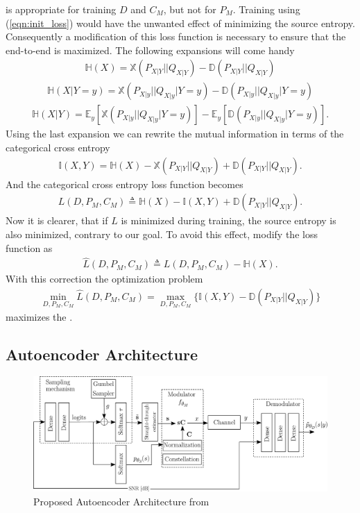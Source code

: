 is appropriate for training $D$ and $C_M$, but not for $P_M$. Training using (\ref{eqn:init_loss}) would have the unwanted effect of minimizing the source entropy. Consequently a modification of this loss function is necessary to ensure that the end-to-end  is maximized. The following expansions will come handy
\begin{align}
	\mathbb{H}(X) = \mathbb{X}(P_{X|Y}||Q_{X|Y}) - \mathbb{D}(P_{X|Y}||Q_{X|Y})
\end{align}
\begin{align}
	\mathbb{H}(X|Y=y) = \mathbb{X}(P_{X|y}||Q_{X|y}|Y=y) - \mathbb{D}(P_{X|y}||Q_{X|y}|Y=y)
\end{align}
\begin{align}
	\mathbb{H}(X|Y) = \mathbb{E}_y\left[\mathbb{X}(P_{X|y}||Q_{X|y}|Y=y)\right] - \mathbb{E}_y \left[\mathbb{D}(P_{X|y}||Q_{X|y}|Y=y)\right].
\end{align}
Using the last expansion we can rewrite the mutual information in terms of the categorical cross entropy
\begin{align}
	\mathbb{I} \left(X , Y\right) = \mathbb{H}(X) - \mathbb{X}(P_{X|Y}||Q_{X|Y}) + \mathbb{D}(P_{X|Y}||Q_{X|Y}).
\end{align}
And the categorical cross entropy loss function becomes 
\begin{align}
	L(D, P_M, C_M) \triangleq \mathbb{H}(X) - \mathbb{I} \left(X , Y\right) + \mathbb{D}(P_{X|Y}||Q_{X|Y}).
\end{align}
Now it is clearer, that if $L$ is minimized during training, the source entropy is also minimized, contrary to our goal. To avoid this effect, \citeauthor{Stark} modify the loss function as
\begin{align}
	\hat{L}(D, P_M, C_M) \triangleq L(D, P_M, C_M) - \mathbb{H}(X).
\end{align}
With this correction the optimization problem 
\begin{align}
	\min_{D, P_M, C_M}\hat{L}(D, P_M, C_M) = \max_{D, P_M, C_M} \{ \mathbb{I} \left(X , Y\right) - \mathbb{D}(P_{X|Y}||Q_{X|Y})\}
\end{align}
maximizes the .
\subsection{Autoencoder Architecture}

\begin{figure}[H]
	\includegraphics[width=\textwidth]{figs/stark_diagram.pdf}
	\centering	
	\caption{Proposed Autoencoder Architecture from \cite{Stark}}
	\label{fig:starkAe}
\end{figure}

